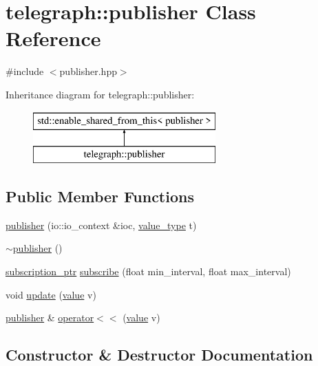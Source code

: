 \hypertarget{classtelegraph_1_1publisher}{}\section{telegraph\+:\+:publisher Class Reference}
\label{classtelegraph_1_1publisher}


{\ttfamily \#include $<$publisher.\+hpp$>$}

Inheritance diagram for telegraph\+:\+:publisher\+:\begin{figure}[H]
\begin{center}
\leavevmode
\includegraphics[height=2.000000cm]{classtelegraph_1_1publisher}
\end{center}
\end{figure}
\subsection*{Public Member Functions}
\begin{DoxyCompactItemize}
\item 
\hyperlink{classtelegraph_1_1publisher_a8ae019593c70465dc12354a08c26efed}{publisher} (io\+::io\+\_\+context \&ioc, \hyperlink{classtelegraph_1_1value__type}{value\+\_\+type} t)
\item 
\hyperlink{classtelegraph_1_1publisher_a69bd0368a3a03a2a26c45768cabaaea6}{$\sim$publisher} ()
\item 
\hyperlink{namespacetelegraph_a58641aa5b1a2cbdb0431916a87069f64}{subscription\+\_\+ptr} \hyperlink{classtelegraph_1_1publisher_a9ecf7dc2e9366618be852b04485a00eb}{subscribe} (float min\+\_\+interval, float max\+\_\+interval)
\item 
void \hyperlink{classtelegraph_1_1publisher_afe6033c401deb3af2a849e5059def250}{update} (\hyperlink{classtelegraph_1_1value}{value} v)
\item 
\hyperlink{classtelegraph_1_1publisher}{publisher} \& \hyperlink{classtelegraph_1_1publisher_a48b08a6577fd2b047186217adbfa5b83}{operator$<$$<$} (\hyperlink{classtelegraph_1_1value}{value} v)
\end{DoxyCompactItemize}


\subsection{Constructor \& Destructor Documentation}
\mbox{\label{classtelegraph_1_1publisher_a8ae019593c70465dc12354a08c26efed}} 
